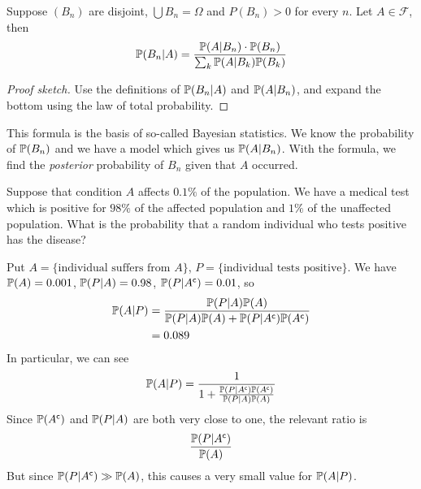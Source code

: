 \documentclass{../../template/note}
\begin{document}
    \begin{proposition}
        Suppose \((B_n)\) are disjoint, \(\bigcup B_n = \Omega\) and \(P(B_n) > 0\) for every \(n\). Let \(A \in \mathcal F\), then
        \begin{align*}
            \mathbb P(B_n |  A) = \frac{\mathbb P(A |  B_n) \cdot \mathbb P(B_n)}{\sum_k \mathbb P(A |  B_k)\mathbb P(B_k)}
        \end{align*}
    \end{proposition}
    
    \begin{proof}[Proof sketch]
        Use the definitions of \(\mathbb P(B_n |  A) \) and \(\mathbb P(A |  B_n)\), and expand the bottom using the law of total probability.
    \end{proof}
    
    This formula is the basis of so-called Bayesian statistics. We know the probability of \(\mathbb P(B_n)\) and we have a model which gives us \(\mathbb P(A |  B_n)\). With the formula, we find the \emph{posterior} probability of \(B_n\) given that \(A\) occurred.
    
    \begin{example*}
        Suppose that condition \(A\) affects \(0.1\%\) of the population. We have a medical test which is positive for \(98\%\) of the affected population and \(1\%\) of the unaffected population. What is the probability that a random individual who tests positive has the disease?

        Put \(A = \{\text{individual suffers from }A\}\), \(P = \{\text{individual tests positive}\}\). We have \(\mathbb P(A) = 0.001\), \(\mathbb P(P |  A) = 0.98\), \(\mathbb P(P |  A^{\mathsf{c}}) = 0.01\), so
        \begin{align*}
            \mathbb P(A |  P) &= \frac{\mathbb P(P |  A) \mathbb P(A)}{\mathbb P(P |  A)\mathbb P(A) + \mathbb P(P| A^{\mathsf{c}})\mathbb P(A^{\mathsf{c}})} \\
            &= 0.089
        \end{align*}
        In particular, we can see
        \begin{align*}
            \mathbb P(A |  P) = \frac{1}{1 + \frac{\mathbb P(P| A^{\mathsf{c}})\mathbb P(A^{\mathsf{c}})}{\mathbb P(P |  A)\mathbb P(A)}}
        \end{align*}
        Since \(\mathbb P(A^{\mathsf{c}})\) and \(\mathbb P(P| A)\) are both very close to one, the relevant ratio is
        \begin{align*}
            \frac{\mathbb P(P |  A^{\mathsf{c}})}{\mathbb P(A)}
        \end{align*}
        But since \(\mathbb P(P |  A^{\mathsf{c}}) \gg \mathbb P(A)\), this causes a very small value for \(\mathbb P(A |  P)\).
    \end{example*}
\end{document}
